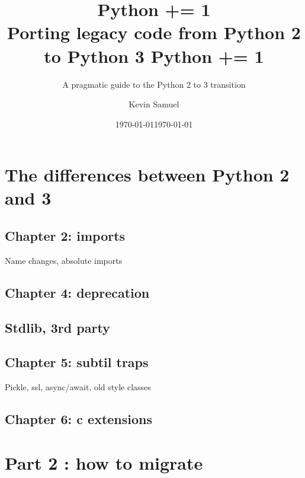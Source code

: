 \documentclass[paperwidth=8in, paperheight=10in,lang=en]{elegantbook}
\title{
  Python += 1 \\
  \large Porting legacy code from Python 2 to Python 3
}
\title{Python += 1}
\subtitle{A pragmatic guide to the Python 2 to 3 transition}
\institute{Bite Code}
\date{\today}
\author{Kevin Samuel}
\date{\today}
\begin{document}
\maketitle

\frontmatter

\tableofcontents



\mainmatter

\hypersetup{pageanchor=true}

\part{The differences between Python 2 and 3}







\chapter{Chapter 2: imports}

Name changes, absolute imports




\chapter{Chapter 4: deprecation}

\chapter{Stdlib, 3rd party}

\chapter{Chapter 5: subtil traps}

Pickle, ssl, async/await, old style classes

\chapter{Chapter 6:  c extensions}

\part{Part 2 : how to migrate}
\end{document}

